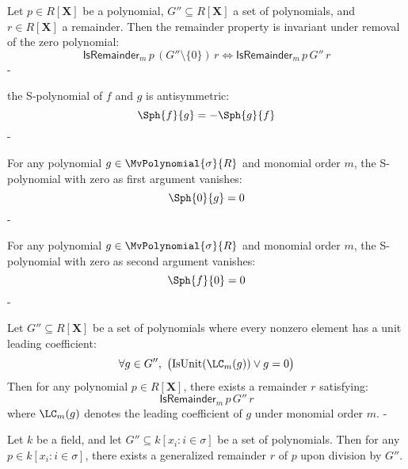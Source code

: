 \begin{lemma}\label{MonomialOrder.isRemainder_of_singleton_zero_iff_isRemainder}
  \leanok
  Let $p \in R[\mathbf{X}]$ be a polynomial, $G'' \subseteq R[\mathbf{X}]$ a set of polynomials,
and $r \in R[\mathbf{X}]$ a remainder. Then the remainder property is invariant under
removal of the zero polynomial:
\[
\mathsf{IsRemainder}_m\,p\,(G'' \setminus \{0\})\,r \iff \mathsf{IsRemainder}_m\,p\,G''\,r
\]
-
\end{lemma}

\begin{lemma}\label{MonomialOrder.sPolynomial_antisymm}
  \leanok
  the S-polynomial of $f$ and $g$ is antisymmetric:
\[
\Sph{f}{g} = -\Sph{g}{f}
\]
-
\end{lemma}

\begin{lemma}\label{MonomialOrder.sPolynomial_eq_zero_of_left_eq_zero}
  \leanok
  For any polynomial $g \in \MvPolynomial{\sigma}{R}$ and monomial order $m$,
the S-polynomial with zero as first argument vanishes:
\[
\Sph{0}{g} = 0
\]
-
\end{lemma}

\begin{lemma}\label{MonomialOrder.sPolynomial_eq_zero_of_right_eq_zero'}
  \leanok
  For any polynomial $g \in \MvPolynomial{\sigma}{R}$ and monomial order $m$,
the S-polynomial with zero as second argument vanishes:
\[
\Sph{f}{0} = 0
\]
-
\end{lemma}

\begin{lemma}\label{MonomialOrder.div_set'}
  \leanok
  Let $G'' \subseteq R[\mathbf{X}]$ be a set of polynomials where every nonzero element has a unit leading coefficient:
\[
\forall g \in G'',\ \big(\mathrm{IsUnit}(\LC_m(g)) \lor g = 0\big)
\]
Then for any polynomial $p \in R[\mathbf{X}]$, there exists a remainder $r$ satisfying:
\[
\mathsf{IsRemainder}_m\,p\,G''\,r
\]
where $\LC_m(g)$ denotes the leading coefficient of $g$ under monomial order $m$.
-
\end{lemma}

\begin{lemma}\label{MonomialOrder.div_set''}
  \leanok
  Let \( k \) be a field, and let \( G'' \subseteq k[x_i : i \in \sigma] \) be a set of polynomials.
Then for any \( p \in k[x_i : i \in \sigma] \), there exists a generalized remainder \( r \) of \( p \) upon division by \( G'' \).

\end{lemma}

